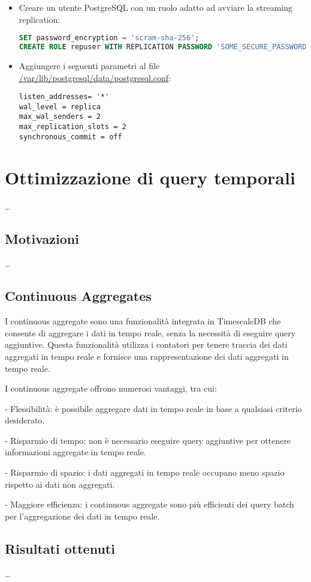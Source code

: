 \begin{itemize}
  \item Creare un utente PostgreSQL con un ruolo adatto ad avviare la streaming replication:
   \begin{lstlisting}[language=sql, caption=TODO]
SET password_encryption = 'scram-sha-256'; 
CREATE ROLE repuser WITH REPLICATION PASSWORD 'SOME_SECURE_PASSWORD' LOGIN;\end{lstlisting}
  \item Aggiungere i seguenti parametri al file \url{/var/lib/postgresql/data/postgresql.conf}:
  \begin{lstlisting}[caption=TODO]
listen_addresses= '*'
wal_level = replica
max_wal_senders = 2
max_replication_slots = 2
synchronous_commit = off
\end{lstlisting}
\end{itemize}

\section{Ottimizzazione di query temporali}\label{sec:cont-aggr}
\ldots

\subsection{Motivazioni}\label{ssec:cont-aggr-motivazioni}
\ldots

\subsection{Continuous Aggregates}\label{ssec:cont-aggr}
I continuous aggregate sono una funzionalità integrata in TimescaleDB che consente di aggregare i dati in tempo reale, senza la necessità di eseguire query aggiuntive. Questa funzionalità utilizza i contatori per tenere traccia dei dati aggregati in tempo reale e fornisce una rappresentazione dei dati aggregati in tempo reale.

I continuous aggregate offrono numerosi vantaggi, tra cui:

- Flessibilità: è possibile aggregare dati in tempo reale in base a qualsiasi criterio desiderato.

- Risparmio di tempo: non è necessario eseguire query aggiuntive per ottenere informazioni aggregate in tempo reale.

- Risparmio di spazio: i dati aggregati in tempo reale occupano meno spazio rispetto ai dati non aggregati.

- Maggiore efficienza: i continuous aggregate sono più efficienti dei query batch per l'aggregazione dei dati in tempo reale.

\subsection{Risultati ottenuti}\label{ssec:cont-aggr-risultati}
\ldots